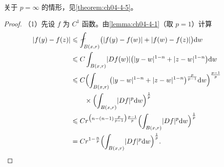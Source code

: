 \documentclass[../../main.tex]{subfiles}%
\begin{document}
\begin{remark}\label{remark:ch04-thm-4-10-p无穷}
关于 $p=\infty$ 的情形，见\cref{theorem:ch04-4-5}。%
\end{remark}

\begin{proof}
（1）先设 $f$ 为 $C^1$ 函数。由\cref{lemma:ch04-4-1}（取 $p=1$）计算%
\begin{align*}
\lvert f(y)-f(z)\rvert
&\leqslant\fint_{B(x,r)}\bigl(\lvert f(y)-f(w)\rvert+\lvert f(w)-f(z)\rvert\bigr)\diff w\\
&\leqslant C\int_{B(x,r)}\lvert Df(w)\rvert\bigl(\lvert y-w\rvert^{1-n}+\lvert z-w\rvert^{1-n}\bigr)\diff w\\
&\leqslant C\Bigl(\int_{B(x,r)}\bigl(\lvert y-w\rvert^{1-n}+\lvert z-w\rvert^{1-n}\bigr)^{\frac{p}{p-1}}\diff w\Bigr)^{\frac{p-1}{p}}\\
&\qquad\times\Bigl(\int_{B(x,r)}\lvert Df\rvert^{p}\diff w\Bigr)^{\frac{1}{p}}\\
&\leqslant C r^{\bigl(n-(n-1)\frac{p}{p-1}\bigr)\frac{p-1}{p}}\Bigl(\int_{B(x,r)}\lvert Df\rvert^{p}\diff w\Bigr)^{\frac{1}{p}}\\
&=C r^{1-\frac{n}{p}}\Bigl(\int_{B(x,r)}\lvert Df\rvert^{p}\diff w\Bigr)^{\frac{1}{p}}.
\end{align*}


\end{proof}
\end{document}

